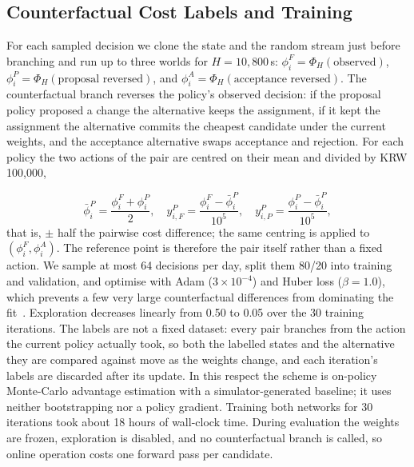 \documentclass[a4paper]{llncs}
\begin{document}
\subsection{Counterfactual Cost Labels and Training}
\label{sec:arch-labels}
For each sampled decision we clone the state and the random stream just
before branching and run up to three worlds for $H=10{,}800$\,s:
$\phi_i^F=\Phi_H(\text{observed})$,
$\phi_i^P=\Phi_H(\text{proposal reversed})$, and
$\phi_i^A=\Phi_H(\text{acceptance reversed})$. The counterfactual branch
reverses the policy's observed decision: if the proposal policy proposed
a change the alternative keeps the assignment, if it kept the assignment
the alternative commits the cheapest candidate under the current
weights, and the acceptance alternative swaps acceptance and rejection.
For each policy the two actions of the pair are centred on their mean
and divided by KRW 100{,}000,

\begin{equation}
\bar\phi_i^P=\frac{\phi_i^F+\phi_i^P}{2},\quad
y_{i,F}^P=\frac{\phi_i^F-\bar\phi_i^P}{10^5},\quad
y_{i,P}^P=\frac{\phi_i^P-\bar\phi_i^P}{10^5},
\end{equation}
that is, $\pm$ half the pairwise cost difference; the same centring is
applied to $(\phi_i^F,\phi_i^A)$. The reference point is therefore the
pair itself rather than a fixed action.
We sample at most 64 decisions per day, split them 80/20 into training
and validation, and optimise with Adam ($3\times10^{-4}$) and Huber loss
($\beta=1.0$), which prevents a few very large counterfactual
differences from dominating the fit~\cite{refhuber}. Exploration
decreases linearly from 0.50 to 0.05 over the 30 training iterations.
The labels are not a fixed dataset: every pair branches from the action
the current policy actually took, so both the labelled states and the
alternative they are compared against move as the weights change, and
each iteration's labels are discarded after its update. In this respect
the scheme is on-policy Monte-Carlo advantage estimation with a
simulator-generated baseline; it uses neither bootstrapping nor a policy
gradient. Training both networks for 30 iterations took about 18 hours
of wall-clock time. During evaluation the weights are frozen,
exploration is disabled, and no counterfactual branch is called, so
online operation costs one forward pass per candidate.

\end{document}

